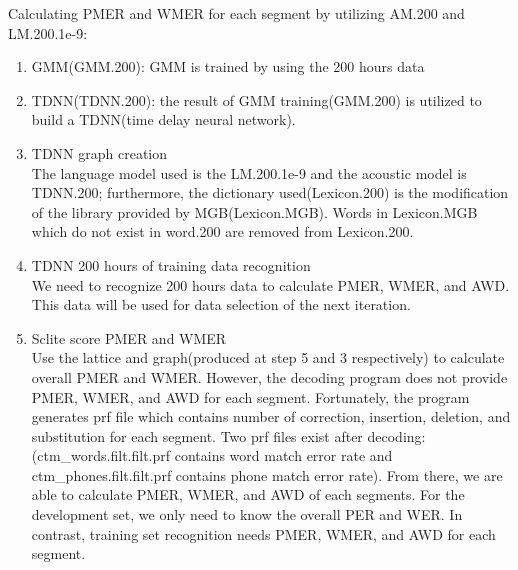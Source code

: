 Calculating PMER and WMER for each segment by utilizing AM.200 and LM.200.1e-9:
\begin{enumerate}
\item GMM(GMM.200): GMM is trained by using the 200 hours data
\item TDNN(TDNN.200): the result of GMM training(GMM.200) is utilized to build a TDNN(time delay neural network). 
\item TDNN graph creation \\
The language model used is the LM.200.1e-9 and  the acoustic model is  TDNN.200; furthermore, the dictionary used(Lexicon.200) is the modification of the library provided by MGB(Lexicon.MGB). Words in Lexicon.MGB which do not exist in word.200 are removed from Lexicon.200.
\item TDNN 200 hours of training data recognition \\
We need to recognize 200 hours data to calculate PMER, WMER, and AWD. This data will be used for data selection of the next iteration.
\item Sclite score PMER and WMER \\
Use the lattice and graph(produced at step 5 and 3 respectively) to calculate overall PMER and WMER. However, the decoding program does not provide PMER, WMER, and AWD for each segment. Fortunately, the program generates prf file which contains number of correction, insertion, deletion, and substitution for each segment. Two prf files exist after decoding:(ctm\_words.filt.filt.prf contains word match error rate and ctm\_phones.filt.filt.prf contains phone match error rate). From there, we are able to calculate  PMER, WMER, and AWD of each segments.  For the development set, we only need to know the overall PER and WER. In contrast, training set recognition needs PMER, WMER, and AWD for each segment. 

\end{enumerate}


